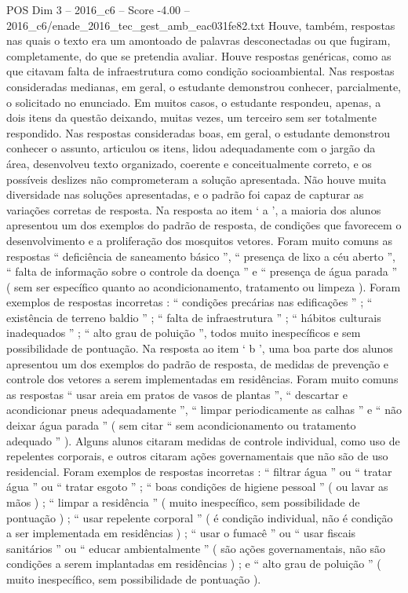 \begin{textsample}{POS Dim 3 – 2016\_c6 – Score -4.00 – 2016\_c6/enade\_2016\_tec\_gest\_amb\_eac031fe82.txt}
Houve, também, respostas nas quais o texto era um amontoado de palavras desconectadas ou que fugiram, completamente, do que se pretendia avaliar.
Houve respostas genéricas, como as que citavam falta de infraestrutura como condição socioambiental.
Nas respostas consideradas medianas, em geral, o estudante demonstrou conhecer, parcialmente, o solicitado no enunciado.
Em muitos casos, o estudante respondeu, apenas, a dois itens da questão deixando, muitas vezes, um terceiro sem ser totalmente respondido.
Nas respostas consideradas boas, em geral, o estudante demonstrou conhecer o assunto, articulou os itens, lidou adequadamente com o jargão da área, desenvolveu texto organizado, coerente e conceitualmente correto, e os possíveis deslizes não comprometeram a solução apresentada.
Não houve muita diversidade nas soluções apresentadas, e o padrão foi capaz de capturar as variações corretas de resposta.
Na resposta ao item ‘ a ’, a maioria dos alunos apresentou um dos exemplos do padrão de resposta, de condições que favorecem o desenvolvimento e a proliferação dos mosquitos vetores.
Foram muito comuns as respostas “ deficiência de saneamento básico ”, “ presença de lixo a céu aberto ”, “ falta de informação sobre o controle da doença ” e “ presença de água parada ” ( sem ser específico quanto ao acondicionamento, tratamento ou limpeza ).
Foram exemplos de respostas incorretas : “ condições precárias nas edificações ” ; “ existência de terreno baldio ” ; “ falta de infraestrutura ” ; “ hábitos culturais inadequados ” ; “ alto grau de poluição ”, todos muito inespecíficos e sem possibilidade de pontuação.
Na resposta ao item ‘ b ’, uma boa parte dos alunos apresentou um dos exemplos do padrão de resposta, de medidas de prevenção e controle dos vetores a serem implementadas em residências.
Foram muito comuns as respostas “ usar areia em pratos de vasos de plantas ”, “ descartar e acondicionar pneus adequadamente ”, “ limpar periodicamente as calhas ” e “ não deixar água parada ” ( sem citar “ sem acondicionamento ou tratamento adequado ” ).
Alguns alunos citaram medidas de controle individual, como uso de repelentes corporais, e outros citaram ações governamentais que não são de uso residencial.
Foram exemplos de respostas incorretas : “ filtrar água ” ou “ tratar água ” ou “ tratar esgoto ” ; “ boas condições de higiene pessoal ” ( ou lavar as mãos ) ; “ limpar a residência ” ( muito inespecífico, sem possibilidade de pontuação ) ; “ usar repelente corporal ” ( é condição individual, não é condição a ser implementada em residências ) ; “ usar o fumacê ” ou “ usar fiscais sanitários ” ou “ educar ambientalmente ” ( são ações governamentais, não são condições a serem implantadas em residências ) ; e “ alto grau de poluição ” ( muito inespecífico, sem possibilidade de pontuação ).

\end{textsample}
